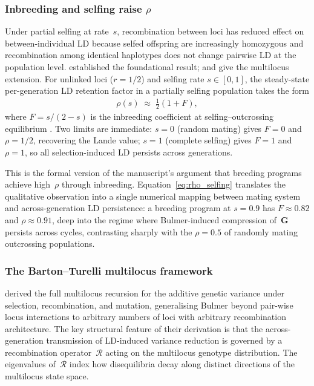 \documentclass[9pt,twocolumn,twoside,lineno]{gsajnl}
\newcommand{\mat}[1]{\mathbf{#1}}
\begin{document}
\subsubsection{Inbreeding and selfing raise $\rho$}

Under partial selfing at rate~$s$, recombination between loci has reduced effect on between-individual LD because selfed offspring are increasingly homozygous and recombination among identical haplotypes does not change pairwise LD at the population level. \citet{Wright1933} established the foundational result; \citet{HaymanMather1953} and \citet{Wright1969} give the multilocus extension. For unlinked loci ($r = 1/2$) and selfing rate $s \in [0, 1]$, the steady-state per-generation LD retention factor in a partially selfing population takes the form
\begin{align}
\rho(s) \;\approx\; \tfrac{1}{2}(1 + F),
\label{eq:rho_selfing}
\end{align}
where $F = s/(2 - s)$ is the inbreeding coefficient at selfing--outcrossing equilibrium \citep{Wright1969}. Two limits are immediate: $s = 0$ (random mating) gives $F = 0$ and $\rho = 1/2$, recovering the Lande value; $s = 1$ (complete selfing) gives $F = 1$ and $\rho = 1$, so all selection-induced LD persists across generations.

This is the formal version of the manuscript's argument that breeding programs achieve high~$\rho$ through inbreeding. Equation~\ref{eq:rho_selfing} translates the qualitative observation into a single numerical mapping between mating system and across-generation LD persistence: a breeding program at $s = 0.9$ has $F \approx 0.82$ and $\rho \approx 0.91$, deep into the regime where Bulmer-induced compression of~$\mat{G}$ persists across cycles, contrasting sharply with the $\rho = 0.5$ of randomly mating outcrossing populations.

\subsubsection{The Barton--Turelli multilocus framework}

\citet{BartonTurelli1991} derived the full multilocus recursion for the additive genetic variance under selection, recombination, and mutation, generalising Bulmer beyond pair-wise locus interactions to arbitrary numbers of loci with arbitrary recombination architecture. The key structural feature of their derivation is that the across-generation transmission of LD-induced variance reduction is governed by a recombination operator~$\mathcal{R}$ acting on the multilocus genotype distribution. The eigenvalues of~$\mathcal{R}$ index how disequilibria decay along distinct directions of the multilocus state space.
\end{document}
